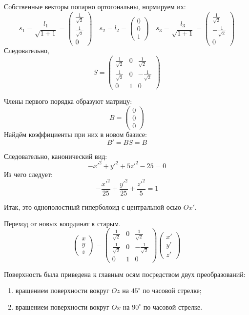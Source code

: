 Собственные векторы попарно ортогональны,
нормируем их:
\[
  s_1 = \frac{l_1}{\sqrt{1 + 1}} =
  \begin{pmatrix}
    \frac{1}{\sqrt{2}} \\
    \frac{1}{\sqrt{2}} \\
    0
  \end{pmatrix} \quad
  s_2 = l_2 =
  \begin{pmatrix}
    0 \\
    0 \\
    1
  \end{pmatrix} \quad
  s_3 = \frac{l_3}{\sqrt{1 + 1}} =
  \begin{pmatrix}
    \frac{1}{\sqrt{2}} \\
    -\frac{1}{\sqrt{2}} \\
    0
  \end{pmatrix}
\]
Следовательно,
\[
  S =
  \begin{pmatrix}
    \frac{1}{\sqrt{2}} & 0 & \frac{1}{\sqrt{2}} \\
    \frac{1}{\sqrt{2}} & 0 & -\frac{1}{\sqrt{2}} \\
    0 & 1 & 0
  \end{pmatrix}
\]

Члены первого порядка образуют матрицу:
\[
  B =
  \begin{pmatrix}
    0 \\ 0 \\ 0
  \end{pmatrix}
\]
Найдём коэффициенты при них в новом базисе:
\[
  B' = B S = B
\]

Следовательно, канонический вид:
\[-{x'}^2 + {y'}^2 + 5 {z'}^2 - 25 = 0\]
Из чего следует:
\[-\frac{{x'}^2}{25} + \frac{{y'}^2}{25} + \frac{{z'}^2}{5} = 1\]

Итак, это однополостный гиперболоид с центральной осью \(Ox'\).

Переход от новых координат к старым.
\[
  \begin{pmatrix} x \\ y \\ z \end{pmatrix} =
  \begin{pmatrix}
    \frac{1}{\sqrt{2}} & 0 & \frac{1}{\sqrt{2}} \\
    \frac{1}{\sqrt{2}} & 0 & -\frac{1}{\sqrt{2}} \\
    0 & 1 & 0
  \end{pmatrix}
  \begin{pmatrix}
    x' \\ y' \\ z'
  \end{pmatrix}
\]

Поверхность была приведена к главным осям посредством двух преобразований:
\begin{enumerate}
  \item вращением поверхности вокруг \(Oz\) на \(45^{\circ}\)
    по часовой стрелке;
  \item вращением поверхности вокруг \(Ox\) на \(90^{\circ}\)
    по часовой стрелке.
\end{enumerate}

